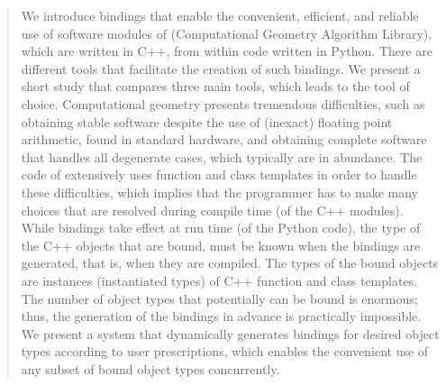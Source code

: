 \begin{abstract}
  We introduce bindings that enable the convenient, efficient, and
  reliable use of software modules of \cgal{} (Computational Geometry
  Algorithm Library), which are written in C++, from within code written in
  Python.
  There are different tools that facilitate the creation of such
  bindings. We present a short study that compares three main tools,
  which leads to the tool of choice.
  Computational geometry presents tremendous difficulties, such as
  obtaining stable software despite the use of (inexact) floating
  point arithmetic, found in standard hardware, and obtaining complete
  software that handles all degenerate cases, which typically are in
  abundance. The code of \cgal{} extensively uses function and class
  templates in order to handle these difficulties, which implies that
  the programmer has to make many choices that are resolved during
  compile time (of the C++ modules). While bindings take effect at run
  time (of the Python code), the type of the C++ objects that are
  bound, must be known when the bindings are generated, that is, when
  they are compiled. The types of the bound objects are instances
  (instantiated types) of C++ function and class templates. The number
  of object types that potentially can be bound is enormous; thus, the
  generation of the bindings in advance is practically impossible. We
  present a system that dynamically generates bindings for desired
  object types according to user prescriptions, which enables the
  convenient use of any subset of bound object types concurrently.
\end{abstract}
